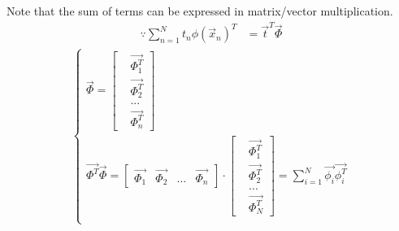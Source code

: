 Note that the sum of terms can be expressed in matrix/vector multiplication.
\begin{align}
\because \sum_{n=1}^{N}t_n\phi(\vec{x}_n)^T &=\vec{t}^T\vec{\Phi}
\end{align}
\begin{align}	
\begin{cases}
\vec{\Phi} = \begin{bmatrix}
&\vec{\Phi_1^T} \\
&\vec{\Phi_2^T} \\
& ... \\
&\vec{\Phi_n^T}
\end{bmatrix} \\	
\vec{\Phi^T}\vec{\Phi} =
\begin{bmatrix}
\vec{\Phi_1} & \vec{\Phi_2} & ...&\vec{\Phi_n}
\end{bmatrix} 
\cdot
\begin{bmatrix}
&\vec{\Phi_1^T} \\
&\vec{\Phi_2^T} \\
& ... \\
&\vec{\Phi_N^T}
\end{bmatrix}  = \sum\limits_{i=1}^{N}\vec{\phi_i}\vec{\phi_i^T}\\
\end{cases}
\end{align}

